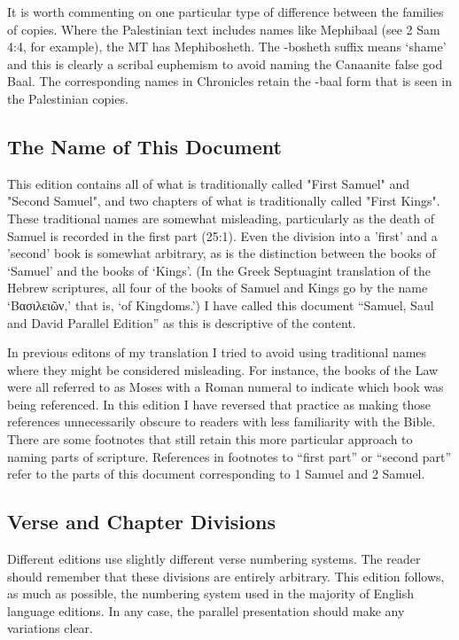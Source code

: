 {It is worth commenting on one particular type of difference between
the families of copies. Where the Palestinian text includes names like
Mephibaal (see 2 Sam 4:4, for example), the MT has Mephibosheth. The
-bosheth suffix means `shame' and this is clearly a scribal euphemism
to avoid naming the Canaanite false god Baal. The corresponding names
in Chronicles retain the -baal form that is seen in the Palestinian
copies.

\subsection*{The Name of This Document}

This edition contains all of what is traditionally called "First Samuel"
and "Second Samuel", and two chapters of what is traditionally called
"First Kings". These traditional names are somewhat misleading, particularly as the death of
Samuel is recorded in the first part (25:1). Even the division into a
'first' and a 'second' book is somewhat arbitrary, as is the
distinction between the books of `Samuel' and the books of
`Kings'. (In the Greek Septuagint translation of the Hebrew
scriptures, all four of the books of Samuel and Kings go by the name
`\textgreek{Βασιλειῶν},' that is, `of Kingdoms.')
I have called this document 
``Samuel, Saul and David Parallel Edition'' as this is descriptive of the
content. 

In previous editons of my translation I tried to avoid using traditional names where they might be considered misleading. For instance, the books of the Law were all referred to as Moses with a Roman numeral to indicate which book was being referenced.  In this edition I have reversed that practice as making those references unnecessarily obscure to readers with less familiarity with the Bible. There are some footnotes that still retain this more particular approach to naming parts of scripture. References in footnotes to ``first part'' or ``second part'' refer to the parts of this document corresponding to 1 Samuel and 2 Samuel.

\subsection*{Verse and Chapter Divisions}

Different editions use slightly different verse numbering systems. The
reader should remember that these divisions are entirely arbitrary. This
edition follows, as much as possible, the numbering system used in the
majority of English language editions. In any case, the parallel
presentation should make any variations clear.

}
